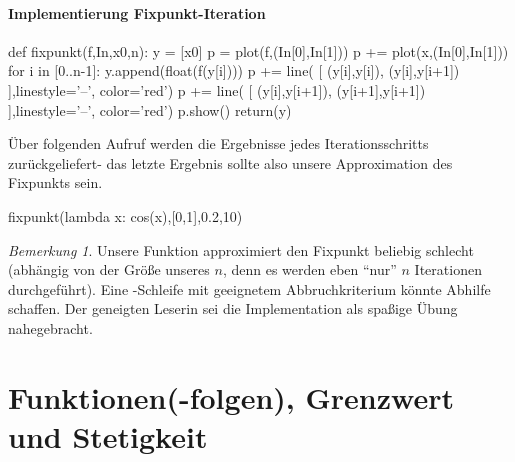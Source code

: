 \documentclass[fontsize=12pt,paper=a4,twoside,bibtotoc,idxtotoc,
liststotoc,pagesize,BCOR1.2cm,DIV15,chapterprefix,pagesize=pdftex]{scrbook}
\theoremstyle{plain}
\theoremstyle{definition}
\theoremstyle{remark}
\newtheorem{bem}[equation]{Bemerkung}
\begin{document}
\subsubsection{Implementierung Fixpunkt-Iteration}
\begin{sagein}
def fixpunkt(f,In,x0,n):
    y = [x0]
    p = plot(f,(In[0],In[1]))
    p += plot(x,(In[0],In[1]))
    for i in [0..n-1]:
        y.append(float(f(y[i])))
        p += line( [ (y[i],y[i]), (y[i],y[i+1]) ],linestyle='--', color='red')
        p += line( [ (y[i],y[i+1]), (y[i+1],y[i+1]) ],linestyle='--', color='red')
    p.show()
    return(y)
\end{sagein}
Über folgenden Aufruf werden die Ergebnisse jedes Iterationsschritts zurückgeliefert- das letzte Ergebnis sollte also unsere Approximation des Fixpunkts sein.
\begin{sagein}
fixpunkt(lambda x: cos(x),[0,1],0.2,10)
\end{sagein}
\begin{sageout}
[0.200000000000000, 0.98006657784124163, 0.55696725280964243, 0.84886216565827077, 0.66083755111661502, 0.78947843776686832, 0.70421571334199318, 0.76211956176066087, 0.72337417210557109, 0.74957657633149311, 0.73197742525819132]
\end{sageout}
\begin{bem}
 Unsere Funktion approximiert den Fixpunkt beliebig schlecht (abhängig von der Größe unseres $n$, denn es werden eben ``nur'' $n$ Iterationen durchgeführt). Eine -Schleife 
mit geeignetem Abbruchkriterium könnte Abhilfe schaffen. Der geneigten Leserin sei die Implementation als spaßige Übung nahegebracht.
\end{bem}
\chapter{Funktionen(-folgen), Grenzwert und Stetigkeit}
\end{document}
